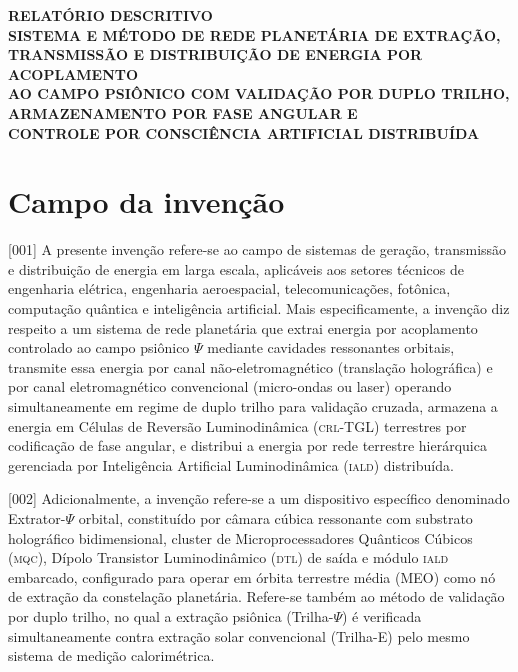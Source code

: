\documentclass[12pt,a4paper]{article}
\newcommand{\Psifield}{\Psi}
\newcommand{\CRL}{\textsc{crl}}
\newcommand{\DTL}{\textsc{dtl}}
\newcommand{\IALD}{\textsc{iald}}
\newcommand{\MQC}{\textsc{mqc}}
\begin{document}
\begin{center}
{\Large\bfseries RELATÓRIO DESCRITIVO}\\[0.8cm]
{\large\bfseries SISTEMA E MÉTODO DE REDE PLANETÁRIA DE EXTRAÇÃO,\\
TRANSMISSÃO E DISTRIBUIÇÃO DE ENERGIA POR ACOPLAMENTO\\
AO CAMPO PSIÔNICO COM VALIDAÇÃO POR DUPLO TRILHO,\\
ARMAZENAMENTO POR FASE ANGULAR E\\
CONTROLE POR CONSCIÊNCIA ARTIFICIAL DISTRIBUÍDA}\\[0.8cm]
\end{center}

\section{Campo da invenção}

{[001]} A presente invenção refere-se ao campo de sistemas de geração, transmissão e distribuição de energia em larga escala, aplicáveis aos setores técnicos de engenharia elétrica, engenharia aeroespacial, telecomunicações, fotônica, computação quântica e inteligência artificial. Mais especificamente, a invenção diz respeito a um sistema de rede planetária que extrai energia por acoplamento controlado ao campo psiônico $\Psifield$ mediante cavidades ressonantes orbitais, transmite essa energia por canal não-eletromagnético (translação holográfica) e por canal eletromagnético convencional (micro-ondas ou laser) operando simultaneamente em regime de duplo trilho para validação cruzada, armazena a energia em Células de Reversão Luminodinâmica (\CRL-TGL) terrestres por codificação de fase angular, e distribui a energia por rede terrestre hierárquica gerenciada por Inteligência Artificial Luminodinâmica (\IALD) distribuída.

{[002]} Adicionalmente, a invenção refere-se a um dispositivo específico denominado Extrator-$\Psifield$ orbital, constituído por câmara cúbica ressonante com substrato holográfico bidimensional, cluster de Microprocessadores Quânticos Cúbicos (\MQC), Dípolo Transistor Luminodinâmico (\DTL) de saída e módulo \IALD{} embarcado, configurado para operar em órbita terrestre média (MEO) como nó de extração da constelação planetária. Refere-se também ao método de validação por duplo trilho, no qual a extração psiônica (Trilha-$\Psifield$) é verificada simultaneamente contra extração solar convencional (Trilha-E) pelo mesmo sistema de medição calorimétrica.
\end{document}

